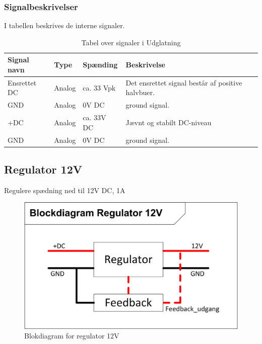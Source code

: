 \subsubsection{Signalbeskrivelser}
I tabellen beskrives de interne signaler.
\begin{table}[H]
\begin{tabular}{|p{3cm}|p{3cm}|p{3cm}|p{4.5cm}|} \hline
\cellcolor[gray]{0.85}Signal navn& \cellcolor[gray]{0.85}Type &\cellcolor[gray]{0.85}Spænding&\cellcolor[gray]{0.85}Beskrivelse\\ \hline
Ensrettet DC & Analog  & ca. 33 Vpk & Det ensrettet signal består af positive halvbuer. \\  \hline
GND  & Analog & 0V DC & ground signal. \\  \hline
+DC & Analog & ca. 33V DC & Jævnt og stabilt DC-niveau\\ \hline
GND & Analog & 0V DC & ground signal.\\ \hline
\end{tabular}
\caption{Tabel over signaler i Udglatning}
\label{table:udglatning}
\end{table}
\newpage
\subsection{Regulator 12V}
Regulere spædning ned til 12V DC, 1A
\begin{figure}[H]
\centering
\includegraphics[scale=1]{billeder/Regulering_12VBlok}
\caption{Blokdiagram for regulator 12V}
\label{fig:regulator_12V}
\end{figure}
